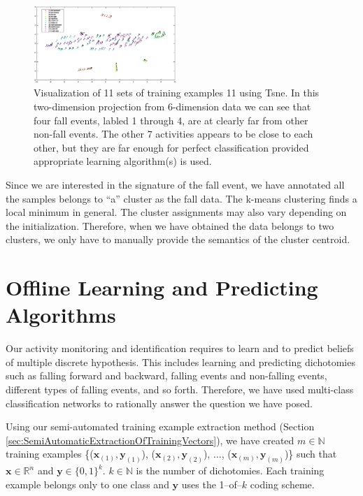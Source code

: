 \documentclass{IEEEtran}
\begin{document}
\begin{figure}[!htb]
\centering
\includegraphics[width=0.48\textwidth]{figures/viz_all_training_examples.eps} 
\caption{Visualization of 11 sets of training examples 11 using Tsne. In this two-dimension projection from 6-dimension data we can see that four fall events, labled 1 through 4, are at clearly far from other non-fall events. The other 7 activities appears to be close to each other, but they are far enough for perfect classification provided appropriate learning algorithm(s) is used.}
 \label{fig:VisualizationOf11setsOfTrainingSets} 
\end{figure}


Since we are 
interested in the signature of the fall event, we have annotated all the samples belongs 
to ``a'' cluster as the fall data. The k-means clustering finds a 
local minimum in general. The cluster assignments may also vary depending on the 
initialization. Therefore, when we have obtained the data belongs to two clusters, we 
only have to manually provide the semantics of the cluster centroid. 

\section{Offline Learning and Predicting Algorithms}
\label{OffLineLearning}


Our activity monitoring and identification requires to learn and to predict beliefs of 
multiple 
discrete hypothesis. This includes learning and predicting dichotomies such as falling 
forward and 
backward, falling events and non-falling events, different types of falling events, and 
so forth. 
Therefore, 
we have used multi-class classification networks to rationally answer the question we 
have posed.

Using our semi-automated training example extraction method (Section 
\ref{sec:SemiAutomaticExtractionOfTrainingVectors}), we have created $m \in 
\mathbb{N}$ 
training examples 
\{($\bm{x}_{(1)}, \bm{y}_{(1)}$), ($\bm{x}_{(2)}, \bm{y}_{(2)}$), $\ldots$, 
($\bm{x}_{(m)}, 
\bm{y}_{(m)}$)\} such that $\bm{x} \in \mathbb{R}^{n}$ and $\bm{y} \in \{0,1\}^k$. $k \in 
\mathbb{N}$ is the number of dichotomies. Each training example belongs only to one class 
and $\bm{y}$ uses the 1--of--$k$ coding scheme.    
\end{document}

